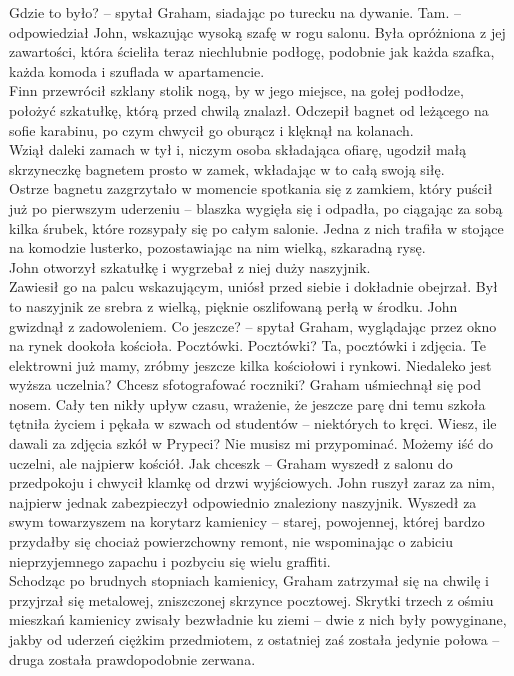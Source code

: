 \documentclass[../MAIN.tex]{subfiles}
\begin{document}
\sx Gdzie to było? -- spytał Graham, siadając po turecku na dywanie.
\xx Tam. -- odpowiedział John, wskazując wysoką szafę w rogu salonu.
\qd
Była opróżniona z jej zawartości, która ścieliła teraz niechlubnie podłogę, podobnie jak każda szafka, każda komoda i szuflada w apartamencie.\\
Finn przewrócił szklany stolik nogą, by w jego miejsce, na gołej podłodze, położyć szkatułkę, którą przed chwilą znalazł. Odczepił bagnet od leżącego na sofie karabinu, po czym chwycił go oburącz i klęknął na kolanach.\\
Wziął daleki zamach w tył i, niczym osoba składająca ofiarę, ugodził małą skrzyneczkę bagnetem prosto w zamek, wkładając w to całą swoją siłę.\\
Ostrze bagnetu zazgrzytało w momencie spotkania się z zamkiem, który puścił już po pierwszym uderzeniu -- blaszka wygięła się i odpadła, po ciągając za sobą kilka śrubek, które rozsypały się po całym salonie. Jedna z nich trafiła w stojące na komodzie lusterko, pozostawiając na nim wielką, szkaradną rysę.\\
John otworzył szkatułkę i wygrzebał z niej duży naszyjnik.\\
Zawiesił go na palcu wskazującym, uniósł przed siebie i dokładnie obejrzał. Był to naszyjnik ze srebra z wielką, pięknie oszlifowaną perłą w środku. John gwizdnął z zadowoleniem.
\sx Co jeszcze? -- spytał Graham, wyglądając przez okno na rynek dookoła kościoła.
\xx Pocztówki.
\xx Pocztówki?
\xx Ta, pocztówki i zdjęcia. Te elektrowni już mamy, zróbmy jeszcze kilka kościołowi i rynkowi.
\xx Niedaleko jest wyższa uczelnia?
\xx Chcesz sfotografować roczniki?
\qd
Graham uśmiechnął się pod nosem.
\sx Cały ten nikły upływ czasu, wrażenie, że jeszcze parę dni temu szkoła tętniła życiem i pękała w szwach od studentów -- niektórych to kręci. Wiesz, ile dawali za zdjęcia szkół w Prypeci?
\xx Nie musisz mi przypominać. Możemy iść do uczelni, ale najpierw kościół.
\xx Jak chcesz\3k -- Graham wyszedł z salonu do przedpokoju i chwycił klamkę od drzwi wyjściowych. 
\qd
John ruszył zaraz za nim, najpierw jednak zabezpieczył odpowiednio znaleziony naszyjnik. Wyszedł za swym towarzyszem na korytarz kamienicy -- starej, powojennej, której bardzo przydałby się chociaż powierzchowny remont, nie wspominając o zabiciu nieprzyjemnego zapachu i pozbyciu się wielu graffiti.\\
Schodząc po brudnych stopniach kamienicy, Graham zatrzymał się na chwilę i przyjrzał się metalowej, zniszczonej skrzynce pocztowej. Skrytki trzech z ośmiu mieszkań kamienicy zwisały bezwładnie ku ziemi -- dwie z nich były powyginane, jakby od uderzeń ciężkim przedmiotem, z ostatniej zaś została jedynie połowa -- druga została prawdopodobnie zerwana.\\
\end{document}
